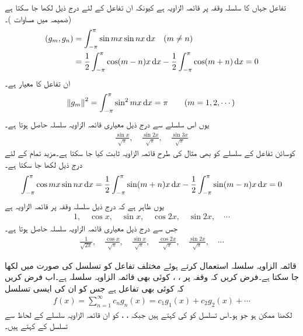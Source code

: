 تفاعل   جہاں  کا سلسلہ وقفہ  پر قائمہ الزاویہ ہے کیونکہ ان تفاعل کے لئے درج ذیل لکھا جا سکتا ہے (ضمیمہ  میں مساوات )۔
\begin{gather}
\begin{aligned}
(g_m,g_n)&=\int_{-\pi}^{\pi}\sin mx\sin nx\dif x\quad (m\ne n)\\
&=\frac{1}{2}\int_{-\pi}^{\pi}\cos(m-n)x\dif x-\frac{1}{2}\int_{-\pi}^{\pi}\cos(m+n)\dif x=0
\end{aligned}
\end{gather}
ان تفاعل کا معیار   ہے۔
\begin{align*}
\norm{g_m}^2=\int_{-\pi}^{\pi} \sin^2 mx\dif x=\pi\quad \quad (m=1,2,\cdots)
\end{align*} 
یوں اس سلسلے سے درج ذیل معیاری قائمہ الزاویہ سلسلہ حاصل ہوتا ہے۔
\begin{align*}
\frac{\sin x}{\sqrt{\pi}},\quad \frac{\sin 2x}{\sqrt{\pi}},\quad \frac{\sin 3x}{\sqrt{\pi}}
\end{align*} 
کوسائن تفاعل  کے سلسلے کو بھی مثال  کی طرح قائمہ الزاویہ ثابت کیا جا سکتا ہے۔مزید تمام  کے لئے درج ذیل لکھا جا سکتا ہے۔
\begin{align*}
\int_{-\pi}^{\pi} \cos mx \sin nx \dif x=\frac{1}{2}\int_{-\pi}^{\pi}\sin(m+n)x\dif x-\frac{1}{2}\int_{-\pi}^{\pi}\sin(m-n)x \dif x=0
\end{align*}
یوں ظاہر ہے کہ درج ذیل سلسلہ  وقفہ  پر قائمہ الزاویہ ہے
\begin{align*}
1,\quad \cos x,\quad \sin x,\quad \cos 2x,\quad \sin 2x,\quad \cdots
\end{align*}
جس سے درج ذیل معیاری قائمہ الزاویہ سلسلہ حاصل ہوتا ہے۔
\begin{align*}
\frac{1}{\sqrt{2\pi}},\quad \frac{\cos x}{\sqrt{\pi}},\quad \frac{\sin x}{\sqrt{\pi}},\quad \frac{\cos 2x}{\sqrt{\pi}},\quad \frac{\sin 2x}{\sqrt{\pi}},\quad \cdots
\end{align*}

قائمہ الزاویہ سلسلہ استعمال کرتے ہوئے مختلف تفاعل کو تسلسل کی صورت میں لکھا جا سکتا ہے۔فرض کریں کہ وقفہ  پر ، ،  کوئی بھی قائمہ الزاویہ سلسلہ ہے۔اب فرض کریں کہ  کوئی بھی تفاعل ہے جس کو ان  کی ایسی تسلسل
\begin{align}\label{مساوات_طاقتی_اضافی_فوریئر_عمومی_الف}
f(x)=\sum_{n=1}^{\infty} c_n g_n(x)=c_1g_1(x)+c_2g_2(x)+\cdots
\end{align}
لکھنا ممکن ہو جو  ہو۔اس تسلسل کو  کی  کہتے ہیں جبکہ ، ،  کو ان قائمہ الزاویہ سلسلے کے لحاظ سے تسلسل کے  کہتے ہیں۔ 

